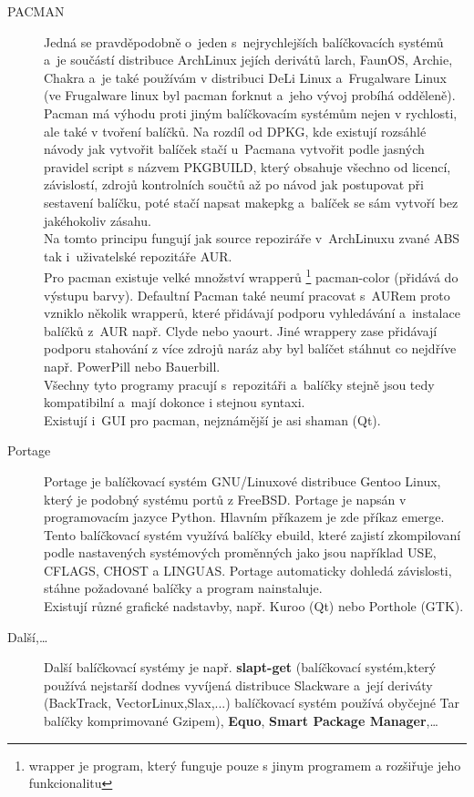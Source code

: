 \documentclass[a4paper,12pt]{article}
\renewcommand{\b}[1]{\textbf{#1}} %
\begin{document}
\begin{description}
 \item[PACMAN] Jedná se pravděpodobně o~jeden s~nejrychlejších balíčkovacích systémů a~je součástí distribuce ArchLinux jejích derivátů larch, FaunOS, Archie, Chakra a~je také používám v distribuci DeLi Linux a~Frugalware Linux (ve Frugalware linux byl pacman forknut a~jeho vývoj probíhá odděleně). Pacman má výhodu proti jiným balíčkovacím systémům nejen v rychlosti, ale také v tvoření balíčků. Na rozdíl od DPKG, kde existují rozsáhlé návody jak vytvořit balíček stačí u~Pacmana vytvořit podle jasných pravidel script s názvem PKGBUILD, který obsahuje všechno od licencí, závislostí, zdrojů kontrolních součtů až po návod jak postupovat při sestavení balíčku, poté stačí napsat makepkg a~balíček se sám vytvoří bez jakéhokoliv zásahu.\\
Na tomto principu fungují jak source repoziráře v~ArchLinuxu zvané ABS tak i~uživatelské repozitáře AUR.\\
Pro pacman existuje velké množství wrapperů
\footnote{wrapper je program, který funguje pouze s jinym programem a rozšiřuje jeho funkcionalitu} pacman-color (přidává do výstupu barvy). Defaultní Pacman také neumí pracovat s~AURem proto vzniklo několik wrapperů, které přidávají podporu vyhledávání a~instalace balíčků z~AUR např. Clyde nebo yaourt. Jiné wrappery zase přidávají podporu stahování z více zdrojů naráz aby byl balíčet stáhnut co nejdříve např. PowerPill nebo Bauerbill.\\
Všechny tyto programy pracují s~repozitáři a~balíčky stejně jsou tedy kompatibilní a~mají dokonce i stejnou syntaxi.\\
Existují i~GUI pro pacman, nejznámější je asi shaman (Qt).
 \item[Portage] Portage je balíčkovací systém GNU/Linuxové distribuce Gentoo Linux, který je podobný systému portů z FreeBSD. Portage je napsán v programovacím jazyce Python. Hlavním příkazem je zde příkaz emerge. Tento balíčkovací systém využívá balíčky ebuild, které zajistí zkompilovaní podle nastavených systémových proměnných jako jsou například USE, CFLAGS, CHOST a LINGUAS. Portage automaticky dohledá závislosti, stáhne požadované balíčky a program nainstaluje.\\
Existují různé grafické nadstavby, např. Kuroo (Qt) nebo Porthole (GTK).
 \item[Další,…] Další balíčkovací systémy je např. \b{slapt-get} (balíčkovací systém,který používá nejstarší dodnes vyvíjená distribuce Slackware a~její deriváty (BackTrack, VectorLinux,Slax,...) balíčkovací systém používá obyčejné Tar balíčky komprimované Gzipem), \b{Equo}, \b{Smart Package Manager},…
 \end{description}
\end{document}
